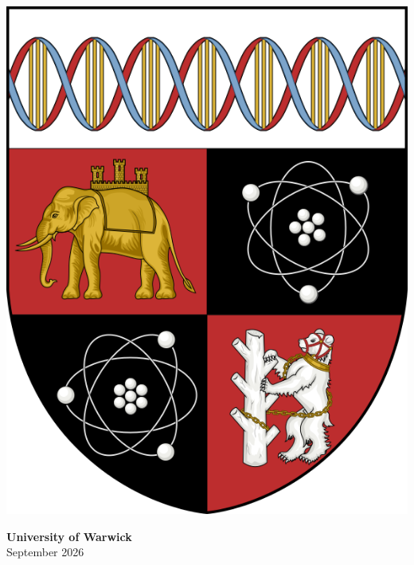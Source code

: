 

\begin{titlepage}
\centering

\vspace*{\fill} %

\begin{minipage}{0.9\textwidth}
\centering

\includegraphics[scale=0.2]{Figures/logo/university_crest.png}

\vspace{2cm}
\begin{Large}
    \textbf{University of Warwick} \\
    September 2026
\end{Large}

\vspace{1cm}

{\makeatletter
\largetitlestyle\fontsize{16}{16}\selectfont\@title
\makeatother}


\end{minipage}
\end{titlepage}
